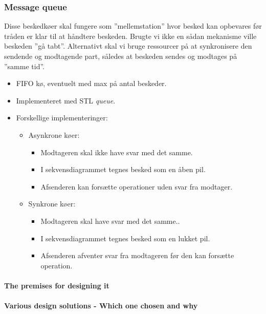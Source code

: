 \subsubsection{Message queue}
Disse beskedkøer skal fungere som ''mellemstation'' hvor besked kan opbevares før tråden er klar til at håndtere beskeden. Brugte vi ikke en sådan mekanisme ville beskeden ''gå tabt''. Alternativt skal vi bruge ressourcer på at synkronisere den sendende og modtagende part, således at beskeden sendes og modtages på ''samme tid''.


\begin{itemize}
	\item FIFO kø, eventuelt med max på antal beskeder.
	\item Implementeret med STL \textit{queue}.
	\item Forskellige implementeringer:
	\begin{itemize}
		\item Asynkrone køer:
		\begin{itemize}
			\item Modtageren skal ikke have svar med det samme.
			\item I sekvensdiagrammet tegnes besked som en åben pil.  
			\item Afsenderen kan forsætte operationer uden svar fra modtager.
		\end{itemize}
		\item Synkrone køer:
		\begin{itemize}
			\item Modtageren skal have svar med det samme..
			\item I sekvensdiagrammet tegnes besked som en lukket pil. 
			\item Afsenderen afventer svar fra modtageren før den kan forsætte operation.
		\end{itemize}
	\end{itemize}
\end{itemize}

\paragraph{The premises for designing it}

\paragraph{Various design solutions - Which one chosen and why}

